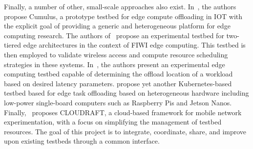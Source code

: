 Finally, a number of other, small-scale approaches also exist.
In~\cite{gedawy2016cumulus}, the authors propose Cumulus, a prototype testbed for edge compute offloading in \gls{IOT} with the explicit goal of providing a generic and heterogeneous platform for edge computing research.
The authors of~\cite{rimal2018experimental} propose an experimental testbed for two-tiered edge architectures in the context of \gls{FIWI} edge computing.
This testbed is then employed to validate wireless access and compute resource scheduling strategies in these systems.
In~\cite{yamanaka2021design}, the authors present an experimental edge computing testbed capable of determining the offload location of a workload based on desired latency parameters.
\cite{diao2019scalable} propose yet another Kubernetes-based testbed based for edge task offloading based on heterogeneous hardware including low-power single-board computers such as Raspberry Pis and Jetson Nanos.
Finally,\ \cite{moorthy2022cloudraft} proposes \gls{CLOUDRAFT}, a cloud-based framework for mobile network experimentation, with a focus on simplifying the management of testbed resources.
The goal of this project is to integrate, coordinate, share, and improve upon existing testbeds through a common interface.
